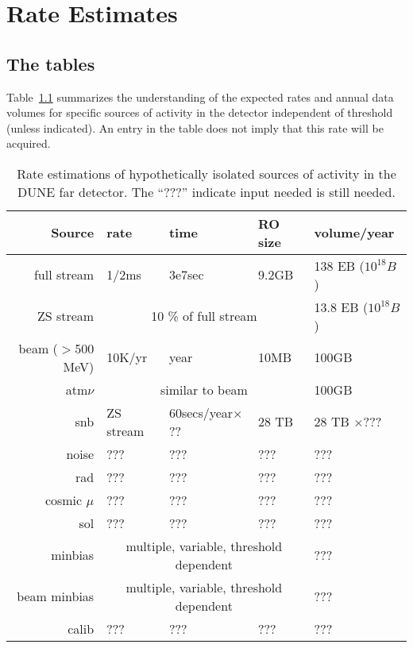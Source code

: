 \chapter{Rate Estimates}
\label{ch:annex-rate}

\section{The tables}


Table~\ref{tab:rate-summary} summarizes the understanding of the
expected rates and annual data volumes for specific sources of activity
in the detector independent of threshold (unless indicated).
An entry in the table does not imply that this rate will be acquired.


\begin{table}[htbf]
  \centering
  \begin{tabular}{|r|l|l|l|l|}
    \hline
    Source & rate & time & RO size & volume/year\\
    \hline
    \hline
    full stream & 1/2ms & 3e7sec &  9.2GB & 138 EB ($10^{18}B$) \\
    \hline
    ZS stream &  \multicolumn{3}{c|}{10 \% of full stream} & 13.8 EB ($10^{18}B$) \\
    \hline
    beam ($>$500 MeV)  & 10K/yr  & year  & 10MB & 100GB \\
    \hline
    atm$\nu$& \multicolumn{3}{c|}{similar to beam}  & 100GB \\
    \hline
    snb  & ZS stream & 60secs/year$\times$?? & 28 TB & 28 TB $\times$??? \\
    \hline
    noise            & ??? & ??? & ??? & ??? \\
    \hline
    rad              & ??? & ??? & ??? & ??? \\
    \hline
    cosmic $\mu$     & ??? & ??? & ??? & ??? \\
    \hline
    sol              & ??? & ??? & ??? & ??? \\
    \hline
    minbias & \multicolumn{3}{c|}{multiple, variable, threshold dependent} & ??? \\
    \hline
    beam minbias & \multicolumn{3}{c|}{multiple, variable, threshold dependent} & ??? \\
    \hline
    calib            & ??? & ??? & ??? & ??? \\
    \hline
  \end{tabular}
  \caption{Rate estimations of hypothetically isolated sources of activity in
    the DUNE far detector.
  The ``???'' indicate input needed is still needed.}
  \label{tab:rate-summary}
\end{table}

